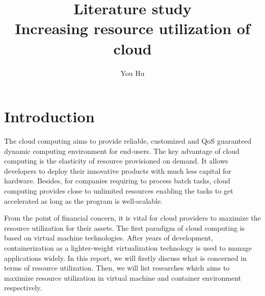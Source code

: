 \documentclass[sigchi]{acmart}
\begin{document}
\title{Literature study \\
       Increasing resource utilization of cloud }

\author{You Hu}



\renewcommand{\shortauthors}{You Hu}






\maketitle

\section{Introduction}
The cloud computing aims to provide reliable, customized and QoS guaranteed dynamic computing environment for end-users\cite{wang2010cloud}.
The key advantage of cloud computing is the elasticity of resource provisioned on demand. 
It allows developers to deploy their innovative products with much less capital for hardware.
Besides, for companies requiring to process batch tasks, cloud computing provides close to unlimited resources enabling the tasks to get accelerated as long as the program is well-scalable.

From the point of financial concern, it is vital for cloud providers to maximize the resource utilization for their assets.
The first paradigm of cloud computing is based on virtual machine technologies. 
After years of development, containerization as a lighter-weight virtualization technology is used to manage applications widely.      
In this report, we will firstly discuss what is concerned in terms of resource utilization.
Then, we will list researches which aims to maximize resource utilization in virtual machine and container environment respectively.
  
\end{document}
